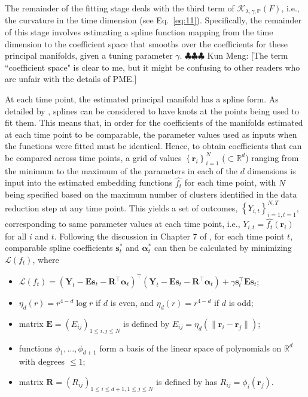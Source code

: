 \documentclass[11pt,reqno]{article}
\newcommand{\T}{\intercal}
\newcommand{\meng}[1]{{\color{purple} \sf $\clubsuit\clubsuit\clubsuit$ Kun Meng: [#1]}}
\theoremstyle{definition}
\begin{document}
The remainder of the fitting stage deals with the third term of $\mathcal{K}_{\lambda, \gamma, \mathbb{P}}(F)$, i.e., the curvature in the time dimension (see Eq.~\eqref{eq:11}). Specifically, the remainder of this stage involves estimating a spline function mapping from the time dimension to the coefficient space that smooths over the coefficients for these principal manifolds, given a tuning parameter $\gamma$. \meng{The term ``coefficient space" is clear to me, but it might be confusing to other readers who are unfair with the details of PME.}

At each time point, the estimated principal manifold has a spline form. As detailed by \cite{greenSilverman1994}, splines can be considered to have knots at the points being used to fit them. This means that, in order for the coefficients of the manifolds estimated at each time point to be comparable, the parameter values used as inputs when the functions were fitted must be identical. Hence, to obtain coefficients that can be compared across time points, a grid of values $\left\{\boldsymbol{r}_i\right\}_{i=1}^{N}$ ($\subset\mathbb{R}^d$) ranging from the minimum to the maximum of the parameters in each of the $d$ dimensions is input into the estimated embedding functions $\widehat{f_t}$ for each time point, with $N$ being specified based on the maximum number of clusters identified in the data reduction step at any time point. This yields a set of outcomes, $\left\{Y_{i,t}\right\}_{i=1, t = 1}^{N, T}$, corresponding to same parameter values at each time point, i.e., $Y_{i,t}=\widehat{f_t}(\boldsymbol{r}_i)$ for all $i$ and $t$. Following the discussion in Chapter 7 of \cite{greenSilverman1994}, for each time point $t$, comparable spline coefficients $\boldsymbol{s}_t^*$ and $\boldsymbol{\alpha}_t^*$ can then be calculated by minimizing $\mathcal{L}(f_t)$, where
\begin{itemize}
    \item $\mathcal{L}(f_t) = (\boldsymbol{Y}_t - \boldsymbol{E}\boldsymbol{s}_t - \boldsymbol{R}^\T\boldsymbol{\alpha}_t)^\T(\boldsymbol{Y}_t - \boldsymbol{E}\boldsymbol{s}_t - \boldsymbol{R}^\T\boldsymbol{\alpha}_t) + \gamma\boldsymbol{s}_t^\T \boldsymbol{E}\boldsymbol{s}_t$;
    \item $\eta_{d}(r) = r^{4 - d}\log r$ if $d$ is even, and $\eta_d(r) = r^{4-d}$ if $d$ is odd;
    \item matrix $\boldsymbol{E}=(E_{ij})_{1\le i,j\le N}$ is defined by $E_{ij} = \eta_{d}(\|\boldsymbol{r}_i - \boldsymbol{r}_j\|)$;
    \item functions $\phi_1,\ldots,\phi_{d+1}$ form a basis of the linear space of polynomials on $\mathbb{R}^d$ with degrees $\le1$;
    \item matrix $\boldsymbol{R}=(R_{ij})_{1\le i\le d+1,1\le j\le N}$ is defined by has $R_{ij} = \phi_i(\boldsymbol{r}_j)$.
\end{itemize}
\end{document}
